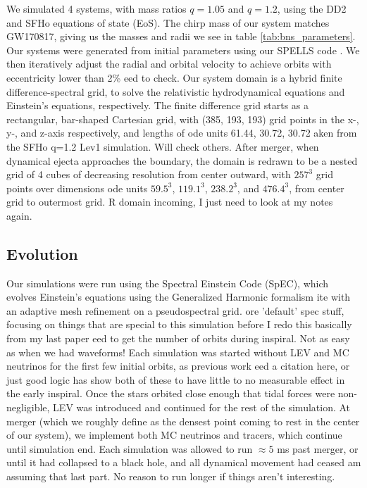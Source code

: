 \documentclass[%
twocolumn,
superscriptaddress,
nofootinbib,
 amsmath,amssymb,
 aps, prd
]{revtex4-2}
\newcommand{\alex}[1]{\color{red}{#1}}
\begin{document}
  We simulated 4 systems, with mass ratios $q=1.05$ and $q=1.2$, using the DD2 \cite{Hempel_2012} and SFHo \cite{Steiner_2013} equations of state (EoS).
  The chirp mass of our system matches GW170817, giving us the masses and radii we see in table \ref{tab:bns_parameters}.
  Our systems were generated from initial parameters using our SPELLS code \cite{Pfeiffer_2003}.
  We then iteratively adjust the radial and orbital velocity to achieve orbits with eccentricity lower than 2\% {\alex need to check}.
  Our system domain is a hybrid finite difference-spectral grid, to solve the relativistic hydrodynamical equations and Einstein's equations, respectively.
  The finite difference grid starts as a rectangular, bar-shaped Cartesian grid, with (385, 193, 193) grid points in the x-, y-, and z-axis respectively, and lengths of {\alex code units} 61.44, 30.72, 30.72 {\alex taken from the SFHo q=1.2 Lev1 simulation. Will check others}.
  After merger, when dynamical ejecta approaches the boundary, the domain is redrawn to be a nested grid of 4 cubes of decreasing resolution from center outward, with $257^3$ grid points over dimensions {\alex code units} $59.5^3$, $119.1^3$, $238.2^3$, and $476.4^3$, from center grid to outermost grid.
{\alex GR domain incoming, I just need to look at my notes again.}  

  \subsection{Evolution}
      Our simulations were run using the Spectral Einstein Code (SpEC), which evolves Einstein's equations using the Generalized Harmonic formalism {\alex cite} with an adaptive mesh refinement on a pseudospectral grid.
      {\alex more 'default' spec stuff, focusing on things that are special to this simulation before I redo this basically from my last paper}
      {\alex need to get the number of orbits during inspiral. Not as easy as when we had waveforms!}
      Each simulation was started without LEV and MC neutrinos for the first few initial orbits, as previous work {\alex need a citation here, or just good logic} has show both of these to have little to no measurable effect in the early inspiral.
      Once the stars orbited close enough that tidal forces were non-negligible, LEV was introduced and continued for the rest of the simulation.
      At merger (which we roughly define as the densest point coming to rest in the center of our system), we implement both MC neutrinos and tracers, which continue until simulation end.
      Each simulation was allowed to run $\approx5$ ms past merger, or until it had collapsed to a black hole, and all dynamical movement had ceased {\alex I am assuming that last part. No reason to run longer if things aren't interesting}.
      
\end{document}
